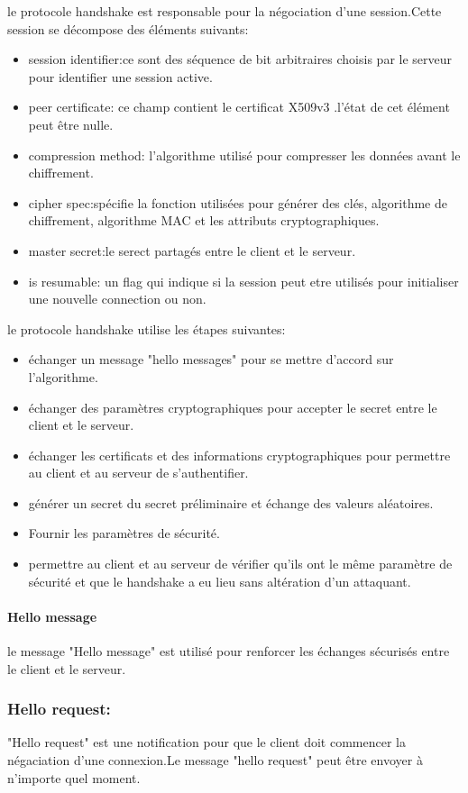 le protocole handshake est responsable pour la négociation d'une session.Cette session se décompose des éléments suivants:
\begin{itemize}
\item session identifier:ce sont des séquence de bit arbitraires choisis par le serveur pour identifier une session active.

\item peer certificate: ce champ contient le certificat X509v3 .l'état de cet élément peut être nulle.
\item compression method: l'algorithme utilisé pour compresser les données avant le chiffrement.
\item cipher spec:spécifie la fonction utilisées pour générer des clés, algorithme de chiffrement, algorithme MAC et les attributs cryptographiques.
\item master secret:le serect partagés entre le client et le serveur.
\item is resumable: un flag qui indique si la session peut etre utilisés pour initialiser une nouvelle connection ou non.\\
\end{itemize}
le protocole handshake utilise les étapes suivantes:
\begin{itemize}
\item échanger un message "hello messages" pour se mettre d'accord sur l'algorithme.
\item échanger des paramètres cryptographiques pour accepter le secret entre le client et le serveur.
\item échanger les certificats et des informations cryptographiques pour permettre au client et au serveur de s'authentifier. 
\item générer un secret du secret préliminaire et échange des valeurs aléatoires.
\item Fournir les paramètres de sécurité.
\item permettre au client et au serveur de vérifier qu'ils ont le m\^eme paramètre de sécurité et que le handshake a eu lieu sans altération d'un attaquant.
\end{itemize}
\paragraph{Hello message}
le message "Hello message" est utilisé pour renforcer les échanges sécurisés entre le client et le serveur.
\subsubsection {Hello request:}
"Hello request" est une notification pour que le client doit commencer la négaciation d'une connexion.Le message "hello request" peut \^etre envoyer à n'importe quel moment.

